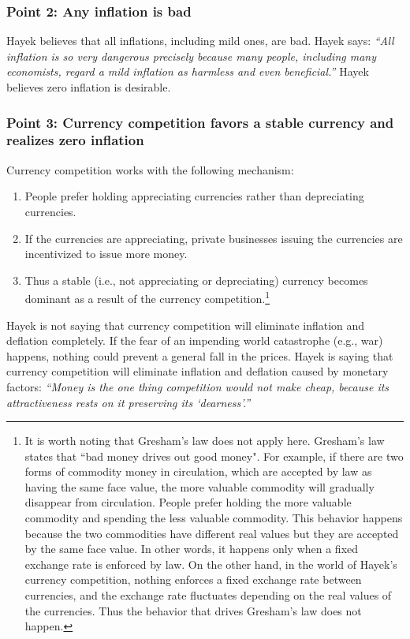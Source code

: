 \documentclass[dvipdfmx,a4paper]{article}
\begin{document}
\subsubsection*{Point 2: Any inflation is bad}

Hayek believes that all inflations, including mild ones, are bad. Hayek says: \textit{``All inflation is so very dangerous precisely because many people, including many economists, regard a mild inflation as harmless and even beneficial.''} Hayek believes zero inflation is desirable.

\subsubsection*{Point 3: Currency competition favors a stable currency and realizes zero inflation}

Currency competition works with the following mechanism:

\begin{enumerate}
\item People prefer holding appreciating currencies rather than depreciating currencies.
\item If the currencies are appreciating, private businesses issuing the currencies are incentivized to issue more money.
\item Thus a stable (i.e., not appreciating or depreciating) currency becomes dominant as a result of the currency competition.\footnote{It is worth noting that Gresham's law does not apply here. Gresham's law states that “bad money drives out good money". For example, if there are two forms of commodity money in circulation, which are accepted by law as having the same face value, the more valuable commodity will gradually disappear from circulation. People prefer holding the more valuable commodity and spending the less valuable commodity. This behavior happens because the two commodities have different real values but they are accepted by the same face value. In other words, it happens only when a fixed exchange rate is enforced by law. On the other hand, in the world of Hayek's currency competition, nothing enforces a fixed exchange rate between currencies, and the exchange rate fluctuates depending on the real values of the currencies. Thus the behavior that drives Gresham's law does not happen.}
\end{enumerate}

Hayek is not saying that currency competition will eliminate inflation and deflation completely. If the fear of an impending world catastrophe (e.g., war) happens, nothing could prevent a general fall in the prices. Hayek is saying that currency competition will eliminate inflation and deflation caused by monetary factors: \textit{``Money is the one thing competition would not make cheap, because its attractiveness rests on it preserving its `dearness'.''}
\end{document}
